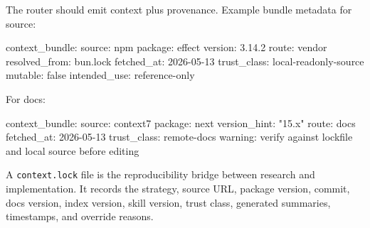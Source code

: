 \documentclass[
  11pt,
  letterpaper,
  numbers=noendperiod,
  parskip=half]{scrartcl}
\newenvironment{Shaded}{}{}
\newcommand{\AttributeTok}[1]{\textcolor[rgb]{0.84,0.23,0.29}{#1}}
\newcommand{\CharTok}[1]{\textcolor[rgb]{0.01,0.18,0.38}{#1}}
\newcommand{\FloatTok}[1]{\textcolor[rgb]{0.00,0.36,0.77}{#1}}
\newcommand{\FunctionTok}[1]{\textcolor[rgb]{0.44,0.26,0.76}{#1}}
\newcommand{\KeywordTok}[1]{\textcolor[rgb]{0.84,0.23,0.29}{#1}}
\newcommand{\StringTok}[1]{\textcolor[rgb]{0.01,0.18,0.38}{#1}}
\begin{document}
The router should emit context plus provenance. Example bundle metadata
for source:

\begin{Shaded}
\begin{Highlighting}[]
\FunctionTok{context\_bundle}\KeywordTok{:}
\AttributeTok{  }\FunctionTok{source}\KeywordTok{:}\AttributeTok{ npm}
\AttributeTok{  }\FunctionTok{package}\KeywordTok{:}\AttributeTok{ effect}
\AttributeTok{  }\FunctionTok{version}\KeywordTok{:}\AttributeTok{ }\FloatTok{3.14.2}
\AttributeTok{  }\FunctionTok{route}\KeywordTok{:}\AttributeTok{ vendor}
\AttributeTok{  }\FunctionTok{resolved\_from}\KeywordTok{:}\AttributeTok{ bun.lock}
\AttributeTok{  }\FunctionTok{fetched\_at}\KeywordTok{:}\AttributeTok{ 2026{-}05{-}13}
\AttributeTok{  }\FunctionTok{trust\_class}\KeywordTok{:}\AttributeTok{ local{-}readonly{-}source}
\AttributeTok{  }\FunctionTok{mutable}\KeywordTok{:}\AttributeTok{ }\CharTok{false}
\AttributeTok{  }\FunctionTok{intended\_use}\KeywordTok{:}\AttributeTok{ reference{-}only}
\end{Highlighting}
\end{Shaded}

For docs:

\begin{Shaded}
\begin{Highlighting}[]
\FunctionTok{context\_bundle}\KeywordTok{:}
\AttributeTok{  }\FunctionTok{source}\KeywordTok{:}\AttributeTok{ context7}
\AttributeTok{  }\FunctionTok{package}\KeywordTok{:}\AttributeTok{ next}
\AttributeTok{  }\FunctionTok{version\_hint}\KeywordTok{:}\AttributeTok{ }\StringTok{"15.x"}
\AttributeTok{  }\FunctionTok{route}\KeywordTok{:}\AttributeTok{ docs}
\AttributeTok{  }\FunctionTok{fetched\_at}\KeywordTok{:}\AttributeTok{ 2026{-}05{-}13}
\AttributeTok{  }\FunctionTok{trust\_class}\KeywordTok{:}\AttributeTok{ remote{-}docs}
\AttributeTok{  }\FunctionTok{warning}\KeywordTok{:}\AttributeTok{ verify against lockfile and local source before editing}
\end{Highlighting}
\end{Shaded}

A \texttt{context.lock} file is the reproducibility bridge between
research and implementation. It records the strategy, source URL,
package version, commit, docs version, index version, skill version,
trust class, generated summaries, timestamps, and override reasons.
\end{document}

